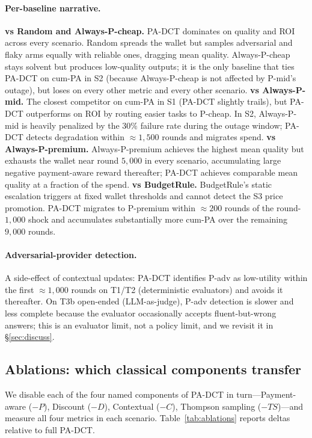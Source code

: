 \paragraph{Per-baseline narrative.}
\textbf{vs Random and Always-P-cheap.} PA-DCT dominates on quality and ROI across every scenario. Random spreads the wallet but samples adversarial and flaky arms equally with reliable ones, dragging mean quality. Always-P-cheap stays solvent but produces low-quality outputs; it is the only baseline that ties PA-DCT on cum-PA in S2 (because Always-P-cheap is not affected by P-mid's outage), but loses on every other metric and every other scenario.
\textbf{vs Always-P-mid.} The closest competitor on cum-PA in S1 (PA-DCT slightly trails), but PA-DCT outperforms on ROI by routing easier tasks to P-cheap. In S2, Always-P-mid is heavily penalized by the $30\%$ failure rate during the outage window; PA-DCT detects degradation within $\approx 1{,}500$ rounds and migrates spend.
\textbf{vs Always-P-premium.} Always-P-premium achieves the highest mean quality but exhausts the wallet near round $5{,}000$ in every scenario, accumulating large negative payment-aware reward thereafter; PA-DCT achieves comparable mean quality at a fraction of the spend.
\textbf{vs BudgetRule.} BudgetRule's static escalation triggers at fixed wallet thresholds and cannot detect the S3 price promotion. PA-DCT migrates to P-premium within $\approx 200$ rounds of the round-$1{,}000$ shock and accumulates substantially more cum-PA over the remaining $9{,}000$ rounds.

\paragraph{Adversarial-provider detection.}
A side-effect of contextual updates: PA-DCT identifies P-adv as low-utility within the first $\approx 1{,}000$ rounds on T1/T2 (deterministic evaluators) and avoids it thereafter. On T3b open-ended (LLM-as-judge), P-adv detection is slower and less complete because the evaluator occasionally accepts fluent-but-wrong answers; this is an evaluator limit, not a policy limit, and we revisit it in \S\ref{sec:discuss}.

\subsection{Ablations: which classical components transfer}
\label{sec:eval-ablations}

We disable each of the four named components of PA-DCT in turn—Payment-aware ($-P$), Discount ($-D$), Contextual ($-C$), Thompson sampling ($-TS$)—and measure all four metrics in each scenario. Table~\ref{tab:ablations} reports deltas relative to full PA-DCT.

